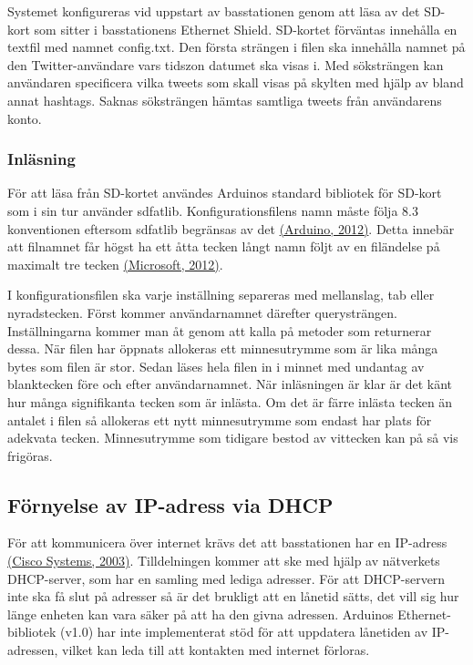 \documentclass[a4paper,11pt]{article}
\begin{document}
Systemet konfigureras vid uppstart av basstationen genom att läsa av det SD-kort som sitter i basstationens Ethernet Shield. SD-kortet förväntas innehålla en textfil med namnet config.txt. Den första strängen i filen ska innehålla namnet på den Twitter-användare vars tidszon datumet ska visas i. Med söksträngen kan användaren specificera vilka tweets som skall visas på skylten med hjälp av bland annat hashtags. Saknas söksträngen hämtas samtliga tweets från användarens konto.

\subsubsection{Inläsning}
För att läsa från SD-kortet användes Arduinos standard bibliotek för SD-kort som i sin tur använder sdfatlib. Konfigurationsfilens namn måste följa 8.3 konventionen eftersom sdfatlib begränsas av det \hyperref[arduino]{(Arduino, 2012)}. Detta innebär att filnamnet får högst ha ett åtta tecken långt namn följt av en filändelse på maximalt tre tecken \hyperref[microsoft]{(Microsoft, 2012)}.

I konfigurationsfilen ska varje inställning separeras med mellanslag, tab eller nyradstecken. Först kommer användarnamnet därefter querysträngen. Inställningarna kommer man åt genom att kalla på metoder som returnerar dessa. När filen har öppnats allokeras ett minnesutrymme som är lika många bytes som filen är stor. Sedan läses hela filen in i minnet med undantag av blanktecken före och efter användarnamnet. När inläsningen är klar är det känt hur många signifikanta tecken som är inlästa. Om det är färre inlästa tecken än antalet i filen så allokeras ett nytt minnesutrymme som endast har plats för adekvata tecken. Minnesutrymme som tidigare bestod av vittecken kan på så vis frigöras.

\subsection{Förnyelse av IP-adress via DHCP}
För att kommunicera över internet krävs det att basstationen har en IP-adress \hyperref[cisco]{(Cisco Systems, 2003)}. Tilldelningen kommer att ske med hjälp av nätverkets DHCP-server, som har en samling med lediga adresser. För att DHCP-servern inte ska få slut på adresser så är det brukligt att en lånetid sätts, det vill sig hur länge enheten kan vara säker på att ha den givna adressen. Arduinos Ethernet-bibliotek (v1.0) har inte implementerat stöd för att uppdatera lånetiden av IP-adressen, vilket kan leda till att kontakten med internet förloras.\\
\end{document}
